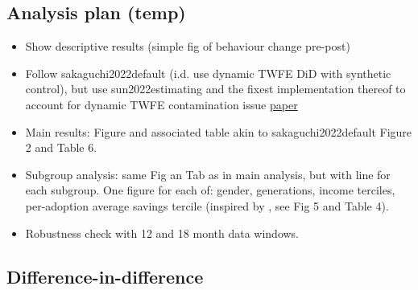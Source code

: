 \documentclass[a4paper, 11pt]{article}
\begin{document}
\subsection{Analysis plan (temp)}%
\label{sub:analysis_plan_temp_}
\begin{itemize}
    \item Show descriptive results (simple fig of behaviour change pre-post)

    \item Follow sakaguchi2022default (i.d. use dynamic TWFE DiD with synthetic
        control), but use sun2022estimating and the
        fixest implementation thereof to account for dynamic TWFE contamination
        issue
        \href{https://lrberge.github.io/fixest/articles/fixest_walkthrough.html#staggered-difference-in-differences-sun-and-abraham-2020}{paper}

    \item Main results: Figure and associated table akin to
        sakaguchi2022default Figure 2 and Table 6.

    \item Subgroup analysis: same Fig an Tab as in main analysis, but with line
        for each subgroup. One figure for each of: gender, generations, income
        terciles, per-adoption average savings tercile (inspired by
        \citet{carlin2017fintech}, see Fig 5 and Table 4).

    \item Robustness check with 12 and 18 month data windows.

\end{itemize}

\subsection{Difference-in-difference}%
\label{sub:difference_in_difference}
\end{document}
